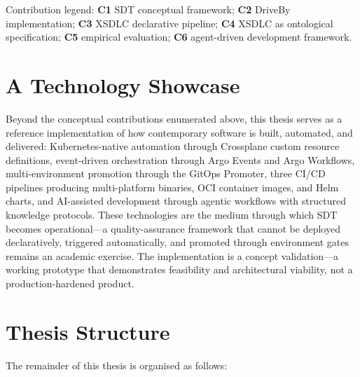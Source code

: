 Contribution legend: \textbf{C1} SDT conceptual framework; \textbf{C2} DriveBy implementation; \textbf{C3} XSDLC declarative pipeline; \textbf{C4} XSDLC as ontological specification; \textbf{C5} empirical evaluation; \textbf{C6} agent-driven development framework.

\section{A Technology Showcase}
\label{subsec:technology-showcase}

Beyond the conceptual contributions enumerated above, this thesis serves as a reference implementation of how contemporary software is built, automated, and delivered: Kubernetes-native automation through Crossplane custom resource definitions, event-driven orchestration through Argo Events and Argo Workflows, multi-environment promotion through the GitOps Promoter, three CI/CD pipelines producing multi-platform binaries, OCI container images, and Helm charts, and AI-assisted development through agentic workflows with structured knowledge protocols. These technologies are the medium through which SDT becomes operational---a quality-assurance framework that cannot be deployed declaratively, triggered automatically, and promoted through environment gates remains an academic exercise. The implementation is a concept validation---a working prototype that demonstrates feasibility and architectural viability, not a production-hardened product.

\section{Thesis Structure}
\label{sec:thesis-structure}

The remainder of this thesis is organised as follows:


